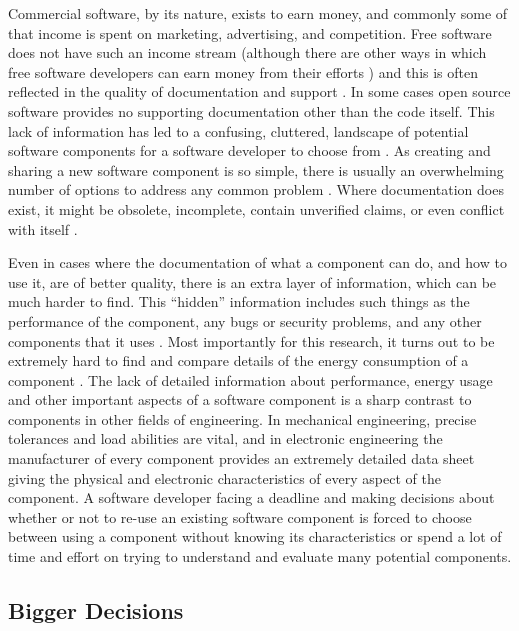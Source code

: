 \label{A51}
Commercial software, by its nature, exists to earn money, and commonly some of that income is spent on marketing, advertising, and competition. Free software does not have such an income stream (although there are other ways in which free software developers can earn money from their efforts \citep{Makinen2022} \citep{Cao2023}) and this is often reflected in the quality of documentation and support \citep{Sowe2008}. In some cases open source software provides no supporting documentation other than the code itself. This lack of information has led to a confusing, cluttered, landscape of potential software components for a software developer to choose from \citep{Teixeira2015}. As creating and sharing a new software component is so simple, there is usually an overwhelming number of options to address any common problem \citep{Spinellis2019}. Where documentation does exist, it might be obsolete, incomplete, contain unverified claims, or even conflict with itself \citep{Midha2011} \citep{Raja2012}.

Even in cases where the documentation of what a component can do, and how to use it, are of better quality, there is an extra layer of information, which can be much harder to find. This \enquote{hidden} information includes such things as the performance of the component, any bugs or security problems, and any other components that it uses \citep{Harrison2022}  \citep{Spinellis2019}. Most importantly for this research, it turns out to be extremely hard to find and compare details of the energy consumption of a component \citep{Field2014} \citep{Jagroep2016a}. The lack of detailed information about performance, energy usage and other important aspects of a software component is a sharp contrast to components in other fields of engineering. In mechanical engineering, precise tolerances and load abilities are vital, and in electronic engineering the manufacturer of every component provides an extremely detailed data sheet giving the physical and electronic characteristics of every aspect of the component. A software developer facing a deadline and making decisions about whether or not to re-use an existing software component is forced to choose between using a component without knowing its characteristics or spend a lot of time and effort on trying to understand and evaluate many potential components.

\subsection{Bigger Decisions}

